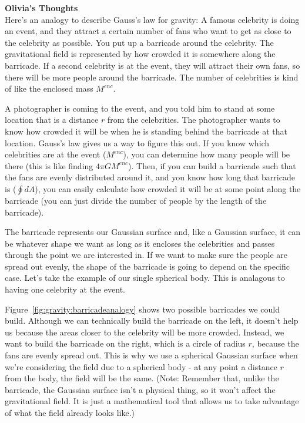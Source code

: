 \begin{framed}
\textbf{Olivia's Thoughts}\\
Here's an analogy to describe Gauss's law for gravity: A famous celebrity is doing an event, and they attract a certain number of fans who want to get as close to the celebrity as possible. You put up a barricade around the celebrity. The gravitational field is represented by how crowded it is somewhere along the barricade. If a second celebrity is at the event, they will attract their own fans, so there will be more people around the barricade. The number of celebrities is kind of like the enclosed mass $M^{enc}$.

A photographer is coming to the event, and you told him to stand at some location that is a distance $r$ from the celebrities. The photographer wants to know how crowded it will be when he is standing behind the barricade at that location. Gauss's law gives us a way to figure this out. If you know which celebrities are at the event ($M^{enc}$), you can determine how many people will be there (this is like finding $4\pi GM^{enc}$). Then, if you can build a barricade such that the fans are evenly distributed around it, and you know how long that barricade is ($\oint dA$), you can easily calculate how crowded it will be at some point along the barricade (you can just divide the number of people by the length of the barricade).

The barricade represents our Gaussian surface and, like a Gaussian surface, it can be whatever shape we want as long as it encloses the celebrities and passes through the point we are interested in. If we want to make sure the people are spread out evenly, the shape of the barricade is going to depend on the specific case. Let's take the example of our single spherical body. This is analagous to having one celebrity at the event.

Figure~\ref{fig:gravity:barricadeanalogy} shows two possible barricades we could build. Although we can technically build the barricade on the left, it doesn't help us because the areas closer to the celebrity will be more crowded. Instead, we want to build the barricade on the right, which is a circle of radius $r$, because the fans are evenly spread out. This is why we use a spherical Gaussian surface when we're considering the field due to a spherical body - at any point a distance $r$ from the body, the field will be the same. (Note: Remember that, unlike the barricade, the Gaussian surface isn't a physical thing, so it won't affect the gravitational field. It is just a mathematical tool that allows us to take advantage of what the field already looks like.)


\end{framed}
